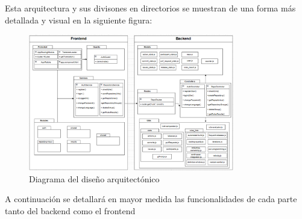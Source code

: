 Esta arquitectura y sus divisones en directorios se muestran de una forma más detallada y visual en la siguiente figura:

\begin{figure}[H]
\centering
\includegraphics[width=0.8\textwidth]{img/Diagrama-paquetes.png}
\caption{Diagrama del diseño arquitectónico}
\label{fig:DiagramaDirectorios}
\end{figure}

A continuación se detallará en mayor medida las funcionalidades de cada parte tanto del backend como el frontend

